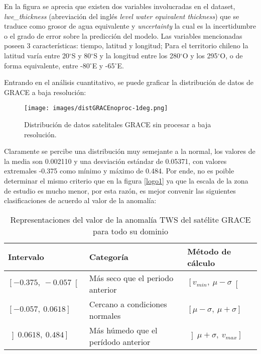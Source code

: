     En la figura se aprecia que existen dos variables involucradas en el dataset, \textit{lwe\_thickness} (abreviación del inglés
    \textit{level water equivalent thickness}) que se traduce como grosor de agua equivalente y \textit{uncertainty} la cual es la incertidumbre
    o el grado de error sobre la predicción del modelo. Las variables mencionadas poseen 3 características: tiempo, latitud y longitud; Para el territorio 
    chileno la latitud varía entre 20$^{\circ}$S y 80$^{\circ}$S y la longitud entre los 280$^{\circ}$O y los 295$^{\circ}$O, o de forma equivalente, entre 
    -80$^{\circ}$E y -65$^{\circ}$E.

    Entrando en el análisis cuantitativo, se puede graficar la distribución de datos de GRACE a baja resolución:
    \begin{figure}[h]
        \centering
              \texttt{[image: images/distGRACEnoproc-1deg.png]}
        \caption[Distribución de datos satelitales a baja resolución]{\footnotesize Distribución de datos satelitales GRACE sin procesar a baja resolución.}
    \end{figure}
    
    Claramente se percibe una distribución muy semejante a la normal, los valores de la media son 0.002110 y una desviación estándar de 0.05371, con valores extremales -0.375 como mínimo y 
    máximo de 0.484. Por ende, no es poible determinar el mismo criterio que en la figura \ref{logo1} ya que la escala de la zona de estudio es mucho menor, por esta razón, es mejor convenir las siguientes clasificaciones
    de acuerdo al valor de la anomalía:

    \begin{table}[H] 
        \caption[Rangos de valores de la anomalía TWS en Chile]{Representaciones del valor de la anomalía TWS del satélite GRACE para todo su dominio}
        \begin{tabularx}{0.9\textwidth}{CCC}
        \toprule
        \textbf{Intervalo}	& \textbf{Categoría}	&\textbf{Método de cálculo}\\
            \midrule
            \textbf{$\left[-0\text{.}375,~-0\text{.}057\right[$}    & Más seco que el periodo anterior       & $\left[v_{min},~ \mu - \sigma\right[$\\
            \textbf{$[-0\text{.}057,~0\text{.}0618]$}	            & Cercano a condiciones normales         & $[\mu - \sigma,~ \mu +\sigma]$ \\
            \textbf{$\left]0\text{.}0618,~0\text{.}484\right] $}    & Más húmedo que el perídodo anterior    & $\left]\mu +\sigma,~v_{max}\right]$\\
            \bottomrule
        \end{tabularx}
    \end{table}
    
